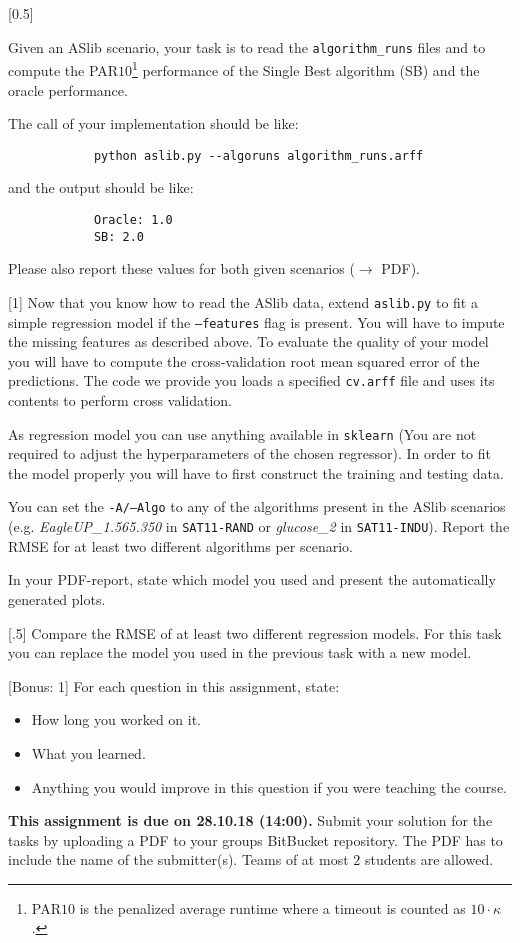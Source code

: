 \documentclass{exam}
\newcommand{\duedate}{28.10.18 (14:00)}
\newcommand{\due}{{\bf This assignment is due on \duedate.} }
\begin{document}
	\begin{questions}
		
		
		
			Given an ASlib scenario, your task is to read the \texttt{algorithm\_runs} files
			and to compute the PAR$10$\footnote{PAR$10$ is the penalized average runtime where a timeout is counted as $10 \cdot \kappa$.} performance of the Single Best algorithm (SB) and the oracle performance.
			
			The call of your implementation should be like:
			
			\begin{verbatim}
			python aslib.py --algoruns algorithm_runs.arff
			\end{verbatim}
			
			and the output should be like:
			
			\begin{verbatim}
			Oracle: 1.0
			SB: 2.0
			\end{verbatim}
			
			Please also report these values for both given scenarios ($\to$ PDF).
		
		
		[1]
			Now that you know how to read the ASlib data, extend \texttt{aslib.py} to fit a simple regression model if the \texttt{--features} flag is present.
			You will have to impute the missing features as described above.
			To evaluate the quality of your model you will have to compute the cross-validation root mean squared error of the predictions.
			The code we provide you loads a specified \texttt{cv.arff} file and uses its contents to perform cross validation.
			
			As regression model you can use anything available in \texttt{sklearn} (You are not required to adjust the hyperparameters of the chosen regressor).
			In order to fit the model properly you will have to first construct the
			training and testing data.
			
			You can set the \texttt{-A/--Algo} to any of the algorithms present in the ASlib scenarios
			(e.g. \textit{EagleUP\_1.565.350} in \texttt{SAT11-RAND} or \textit{glucose\_2} in \texttt{SAT11-INDU}).
			Report the RMSE for at least two different algorithms per scenario.
	
			In your PDF-report, state which model you used and present the automatically generated plots.
			
		[.5]
			Compare the RMSE of at least two different regression models. For this task you can replace the model you used in the previous task with a new model.
			
		[Bonus: 1]
			For each question in this assignment, state:
			\begin{itemize}
				\item How long you worked on it.
				\item What you learned.
				\item Anything you would improve in this question if you were teaching the course.
			\end{itemize}
	\end{questions}

\noindent
\due Submit your solution for the tasks by uploading a PDF to your groups BitBucket repository. The PDF has to include the name of the submitter(s). Teams of at most $2$ students are allowed.
\end{document}
